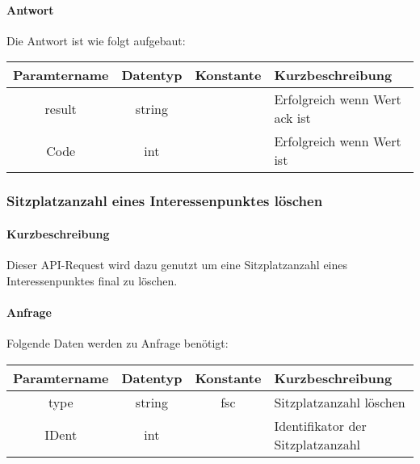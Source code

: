 \paragraph{Antwort}Die Antwort ist wie folgt aufgebaut:
\begin{table}[H]
	\begin{tabular}{|c|c|c|p{6.5cm}|}
		\hline
		\textbf{Paramtername} & \textbf{Datentyp} & \textbf{Konstante} & \textbf{Kurzbeschreibung}                                                                                               \\ \hline
		result              & string           &                 & Erfolgreich wenn Wert {\glqq ack\grqq} ist \\ \hline
		Code                & int              &                 & Erfolgreich wenn Wert {\glqq 0\grqq} ist \\ \hline
	\end{tabular}
\end{table}
\subsubsection{Sitzplatzanzahl eines Interessenpunktes löschen}
\paragraph{Kurzbeschreibung}Dieser API-Request wird dazu genutzt um eine Sitzplatzanzahl eines Interessenpunktes final zu löschen.
\paragraph{Anfrage}Folgende Daten werden zu Anfrage benötigt:
\begin{table}[H]
	\begin{tabular}{|c|c|c|p{6.5cm}|}
		\hline
		\textbf{Paramtername} & \textbf{Datentyp} & \textbf{Konstante} & \textbf{Kurzbeschreibung}                                                                                               \\ \hline
		type                & string            & fsc                & Sitzplatzanzahl löschen \\ \hline
		IDent               & int               &                    & Identifikator der Sitzplatzanzahl \\ \hline
	\end{tabular}
\end{table}
